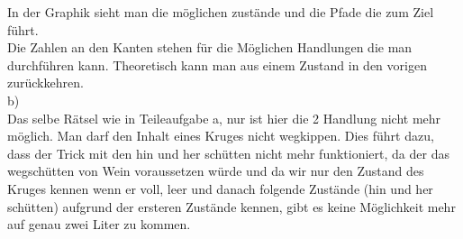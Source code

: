 \documentclass[12pt, paper=a4]{article}
\begin{document}
In der Graphik sieht man die möglichen zustände und die Pfade die zum Ziel führt.\\

Die Zahlen an den Kanten stehen für die Möglichen Handlungen die man durchführen kann. Theoretisch kann man aus einem Zustand in den vorigen zurückkehren.\\

\noindent b)\\
Das selbe Rätsel wie in Teileaufgabe a, nur ist hier die 2 Handlung nicht mehr möglich. Man darf den Inhalt eines Kruges nicht wegkippen. Dies führt dazu, dass der Trick mit den hin und her schütten nicht mehr funktioniert, da der das wegschütten von Wein voraussetzen würde und da wir nur den Zustand des Kruges kennen wenn er voll, leer und danach folgende Zustände (hin und her schütten) aufgrund der ersteren Zustände kennen, gibt es keine Möglichkeit mehr auf genau zwei Liter zu kommen.
\end{document}
